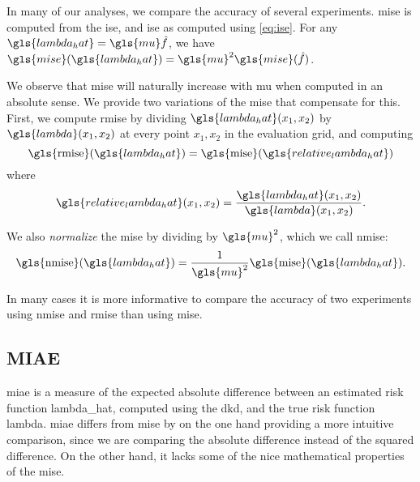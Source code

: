 In many of our analyses, we compare the accuracy of several experiments.
\gls{mise} is computed from the \gls{ise},
and \gls{ise} as computed using \cref{eq:ise}.
For any $\gls{lambda_hat} = \gls{mu} \hat f $,
we have $ \gls{mise}(\gls{lambda_hat}) = \gls{mu}^2 \gls{mise}(\hat f) $.

We observe that \gls{mise} will naturally increase with \gls{mu} when computed in an absolute sense.
We provide two variations of the \gls{mise} that compensate for this.
First, we compute \gls{rmise} by dividing $\gls{lambda_hat}\xvec$ by $\gls{lambda}\xvec$ at every point $x_1, x_2$ in the evaluation grid, and computing
\begin{equation}
\label{eq:rmise}
    \mbox{\gls{rmise}}(\gls{lambda_hat}) = 
        \mbox{\gls{mise}}(\gls{relative_lambda_hat}) \\
\end{equation}
where
\begin{equation}
\label{eq:relative_lambda_hat}
    \gls{relative_lambda_hat}\xvec = 
        \frac{\gls{lambda_hat}\xvec}{\gls{lambda}\xvec}
        \text{.}
\end{equation}

We also \textit{normalize} the \gls{mise} by dividing by $\gls{mu}^2$,
which we call \gls{nmise}:
\begin{equation}
\label{eq:nmise}
    \mbox{\gls{nmise}}(\gls{lambda_hat}) = 
        \frac{1}{\gls{mu}^2} \mbox{\gls{mise}}(\gls{lambda_hat}) \text{.}
\end{equation}

In many cases it is more informative to compare the accuracy of two experiments using \gls{nmise} and \gls{rmise} than using \gls{mise}.

\subsection{MIAE}
\label{subsec:method:miae}

\Gls{miae} is a measure of the expected absolute difference between an estimated risk function \gls{lambda_hat},
computed using the \gls{dkd}, and the true risk function \gls{lambda}.
\Gls{miae} differs from \gls{mise} by on the one hand providing a more intuitive comparison,
since we are comparing the absolute difference instead of the squared difference.
On the other hand, it lacks some of the nice mathematical properties of the \gls{mise}.


